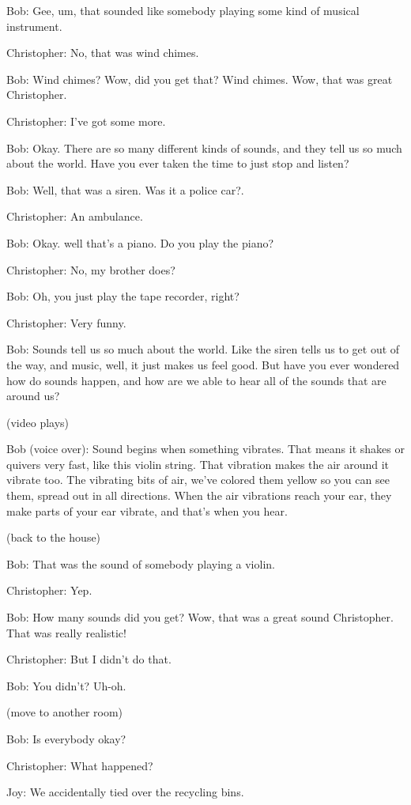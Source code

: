Bob: Gee, um, that sounded like somebody playing some kind of musical instrument.

Christopher: No, that was wind chimes.

Bob: Wind chimes? Wow, did you get that? Wind chimes. Wow, that was great Christopher.

Christopher: I've got some more.

Bob: Okay. There are so many different kinds of sounds, and they tell us so much about the world. Have you ever taken the time to just stop and listen?

Bob: Well, that was a siren. Was it a police car?.

Christopher: An ambulance.

Bob: Okay. well that's a piano. Do you play the piano?

Christopher: No, my brother does?

Bob: Oh, you just play the tape recorder, right?

Christopher: Very funny.

Bob: Sounds tell us so much about the world. Like the siren tells us to get out of the way, and music, well, it just makes us feel good. But have you ever wondered how do sounds happen, and how are we able to hear all of the sounds that are around us?

(video plays)

Bob (voice over): Sound begins when something vibrates. That means it shakes or quivers very fast, like this violin string. That vibration makes the air around it vibrate too. The vibrating bits of air, we've colored them yellow so you can see them, spread out in all directions. When the air vibrations reach your ear, they make parts of your ear vibrate, and that's when you hear.

(back to the house)

Bob: That was the sound of somebody playing a violin.

Christopher: Yep.

Bob: How many sounds did you get? Wow, that was a great sound Christopher. That was really realistic!

Christopher: But I didn't do that.

Bob: You didn't? Uh-oh.

(move to another room)

Bob: Is everybody okay?

Christopher: What happened?

Joy: We accidentally tied over the recycling bins.

